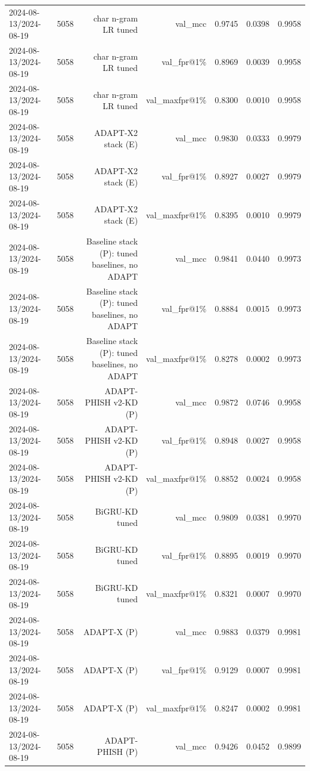 \begin{table}[t]
\begin{tabular}{llrrrrr}
2024-08-13/2024-08-19 & 5058 & char n-gram LR tuned & val\_mcc & 0.9745 & 0.0398 & 0.9958 \\
2024-08-13/2024-08-19 & 5058 & char n-gram LR tuned & val\_fpr@1\% & 0.8969 & 0.0039 & 0.9958 \\
2024-08-13/2024-08-19 & 5058 & char n-gram LR tuned & val\_maxfpr@1\% & 0.8300 & 0.0010 & 0.9958 \\
2024-08-13/2024-08-19 & 5058 & ADAPT-X2 stack (E) & val\_mcc & 0.9830 & 0.0333 & 0.9979 \\
2024-08-13/2024-08-19 & 5058 & ADAPT-X2 stack (E) & val\_fpr@1\% & 0.8927 & 0.0027 & 0.9979 \\
2024-08-13/2024-08-19 & 5058 & ADAPT-X2 stack (E) & val\_maxfpr@1\% & 0.8395 & 0.0010 & 0.9979 \\
2024-08-13/2024-08-19 & 5058 & Baseline stack (P): tuned baselines, no ADAPT & val\_mcc & 0.9841 & 0.0440 & 0.9973 \\
2024-08-13/2024-08-19 & 5058 & Baseline stack (P): tuned baselines, no ADAPT & val\_fpr@1\% & 0.8884 & 0.0015 & 0.9973 \\
2024-08-13/2024-08-19 & 5058 & Baseline stack (P): tuned baselines, no ADAPT & val\_maxfpr@1\% & 0.8278 & 0.0002 & 0.9973 \\
2024-08-13/2024-08-19 & 5058 & ADAPT-PHISH v2-KD (P) & val\_mcc & 0.9872 & 0.0746 & 0.9958 \\
2024-08-13/2024-08-19 & 5058 & ADAPT-PHISH v2-KD (P) & val\_fpr@1\% & 0.8948 & 0.0027 & 0.9958 \\
2024-08-13/2024-08-19 & 5058 & ADAPT-PHISH v2-KD (P) & val\_maxfpr@1\% & 0.8852 & 0.0024 & 0.9958 \\
2024-08-13/2024-08-19 & 5058 & BiGRU-KD tuned & val\_mcc & 0.9809 & 0.0381 & 0.9970 \\
2024-08-13/2024-08-19 & 5058 & BiGRU-KD tuned & val\_fpr@1\% & 0.8895 & 0.0019 & 0.9970 \\
2024-08-13/2024-08-19 & 5058 & BiGRU-KD tuned & val\_maxfpr@1\% & 0.8321 & 0.0007 & 0.9970 \\
2024-08-13/2024-08-19 & 5058 & ADAPT-X (P) & val\_mcc & 0.9883 & 0.0379 & 0.9981 \\
2024-08-13/2024-08-19 & 5058 & ADAPT-X (P) & val\_fpr@1\% & 0.9129 & 0.0007 & 0.9981 \\
2024-08-13/2024-08-19 & 5058 & ADAPT-X (P) & val\_maxfpr@1\% & 0.8247 & 0.0002 & 0.9981 \\
2024-08-13/2024-08-19 & 5058 & ADAPT-PHISH (P) & val\_mcc & 0.9426 & 0.0452 & 0.9899 \\

\end{tabular}
\end{table}
